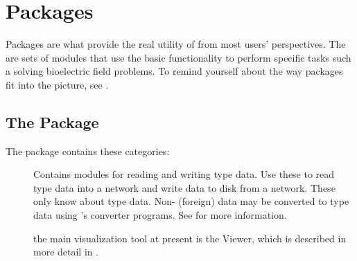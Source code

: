 %
%
%
%
%
%
\section{Packages}
\label{sec:packages}

Packages are what provide the real utility of \SR{} from most users'
perspectives.  The are sets of modules that use the basic \SR{}
functionality to perform specific tasks such a solving bioelectric field
problems.  To remind yourself about the way packages fit into the picture,
see .

\subsection{The \sr{} Package}
\label{sec:srpackage}

The \sr{} package contains these categories:

\begin{description}

\item[] Contains modules for reading and writing \sr{}
  type data.  Use these to read \sr{} type data into a network and write
  data to disk from a network.  These only know about \sr{} type data.
  Non-\sr{} (foreign) data may be converted to \sr{} type data using
  \sr{}'s converter programs.  See  for more information.

\item[] \missing{}
\item[] \missing{}
\item[] \missing{}
\item[] the main visualization tool at present is
  the Viewer, which is described in more detail in .
\end{description}

